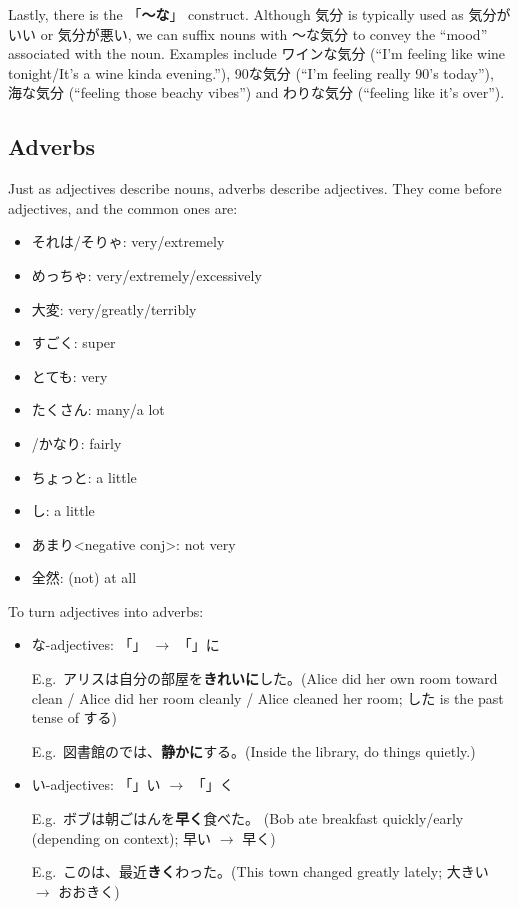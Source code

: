 \documentclass[../nihongo-gakushuu-kyouzai.tex]{subfiles}
\begin{document}
Lastly, there is the 「\textbf{〜な}」 construct. Although 気分 is typically used as 気分がいい or 気分が悪い, we can suffix nouns with 〜な気分 to convey the ``mood'' associated with the noun. Examples include ワインな気分 (``I'm feeling like wine tonight/It's a wine kinda evening.''), 90な気分 (``I'm feeling really 90's today''), 海な気分 (``feeling those beachy vibes'') and わりな気分 (``feeling like it's over'').



\subsection{Adverbs} \label{sec:adverb}
Just as adjectives describe nouns, adverbs describe adjectives. They come before adjectives, and the common ones are:
\begin{itemize}
    \item それは/そりゃ: very/extremely
    \item めっちゃ: very/extremely/excessively
    \item 大変: very/greatly/terribly
    \item すごく: super
    \item とても: very
    \item たくさん: many/a lot
    \item {}/かなり: fairly
    \item ちょっと: a little
    \item {}し: a little
    \item あまり<negative conj>: not very
    \item 全然: (not) at all
\end{itemize}

To turn adjectives into adverbs:
\begin{itemize}
    \item な-adjectives: 「」 $\to$ 「」に

    E.g.\ アリスは自分の部屋を\textbf{きれいに}した。(Alice did her own room toward clean / Alice did her room cleanly / Alice cleaned her room; した is the past tense of する)

    E.g.\ 図書館のでは、\textbf{静かに}する。(Inside the library, do things quietly.)
    \item い-adjectives: 「」い $\to$ 「」く

    E.g.\ ボブは朝ごはんを\textbf{早く}食べた。 (Bob ate breakfast quickly/early (depending on context); 早い $\to$ 早く)

    E.g.\ このは、最近\textbf{きく}わった。(This town changed greatly lately; 大きい $\to$ おおきく)
\end{itemize}
\end{document}
